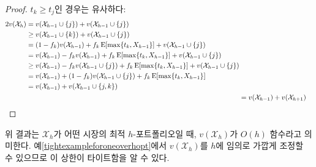 \documentclass[11pt]{article} %
\newif\ifen
\theoremstyle{definition}
\newtheorem{example}{Example}
\theoremstyle{definition}
\newtheorem{example}{예}
\begin{document}
\begin{proof}
\ifen If $t_k \geq t_j$, then the steps are analogous:
\else  $t_k \geq t_j$인 경우는 유사하다:\fi
\begin{align}
\begin{split}
2 v(\mathcal{X}_h) &= v(\mathcal{X}_{h-1} \cup\{j\}) + v(\mathcal{X}_{h-1} \cup\{j\}) \\
&\geq v(\mathcal{X}_{h-1} \cup\{k\}) + v(\mathcal{X}_{h-1} \cup\{j\}) \\
&= (1 - f_k) v(\mathcal{X}_{h-1}) + f_k \operatorname{E}[\max\{t_k, X_{h-1}\}] +  v(\mathcal{X}_{h-1} \cup\{j\})  \\
&= v(\mathcal{X}_{h-1}) - f_k  v(\mathcal{X}_{h-1}) + f_k \operatorname{E}[\max\{t_k, X_{h-1}\}] +  v(\mathcal{X}_{h-1} \cup\{j\})  \\
&\geq v(\mathcal{X}_{h-1}) - f_k  v(\mathcal{X}_{h-1}\cup\{j\}) + f_k \operatorname{E}[\max\{t_k, X_{h-1}\}] +  v(\mathcal{X}_{h-1} \cup\{j\})  \\
&= v(\mathcal{X}_{h-1}) + (1 - f_k) v(\mathcal{X}_{h-1}\cup\{j\}) + f_k \operatorname{E}[\max\{t_k, X_{h-1}\}]  \\
&= v(\mathcal{X}_{h-1}) + v(\mathcal{X}_{h-1} \cup\{j, k\})
\end{split}\\
&= v(\mathcal{X}_{h-1})  + v(\mathcal{X}_{h+1}) \qedhere
\end{align}
\end{proof}

\ifen
It follows that when $\mathcal{X}_h$ is the optimal $h$-portfolio for a given market, $v(\mathcal{X}_h)$ is $O(h)$. Example \ref{tightexampleforoneoverhopt}, in which $v(\mathcal{X}_h)$ can be made arbitrarily close to $h$, establishes the tightness of this bound.
\else
위 결과는 $\mathcal{X}_h$가 어떤 시장의 최적 $h$-포트폴리오일 때, $v(\mathcal{X}_h)$가 $O(h)$ 함수라고 의미한다. 예\ref{tightexampleforoneoverhopt}에서 $v(\mathcal{X}_h)$를 $h$에 임의로 가깝게 조정할 수 있으므로 이 상한이 타이트함을 알 수 있다.
\fi

\end{document}

